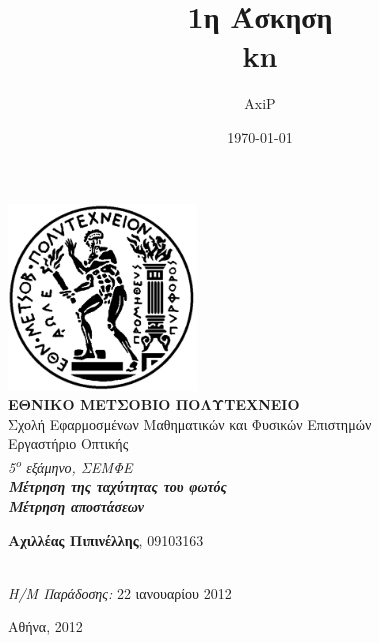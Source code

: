 \documentclass[a4paper,11pt,titlepage]{article}
\title{1η Άσκηση\\kn}
\author{AxiP}
\date{\today}
\begin{document}
\pagestyle{headings}    %

\begin{titlepage}
\begin{center}
\includegraphics[width=50mm]{pyrforos.pdf}\\[0.5cm]
\textbf{\LARGE ΕΘΝΙΚΟ ΜΕΤΣΟΒΙΟ ΠΟΛΥΤΕΧΝΕΙΟ}\\
\textrm{\Large Σχολή Εφαρμοσμένων Μαθηματικών και Φυσικών Επιστημών}\\[2.0cm]
\Huge{Εργαστήριο Οπτικής\\}
\Large{\textit{5\textsuperscript{o} εξάμηνο, ΣΕΜΦΕ}}\\[2.0cm]
\Large{\textit{\textbf{Μέτρηση της ταχύτητας του φωτός\\Μέτρηση αποστάσεων}}}\\[5.0cm]
\normalsize

\begin{minipage}{0.49\textwidth}
\begin{flushleft}
\textbf{Αχιλλέας Πιπινέλλης}, 09103163
\end{flushleft}
\end{minipage}
\begin{minipage}{0.49\textwidth}
\begin{flushright}
\textbf{\\}
\textit{Η/Μ Παράδοσης:} 22 ιανουαρίου 2012
\end{flushright}
\end{minipage}


\vfill
{Αθήνα, 2012}

\end{center}
\end{titlepage}
\end{document}

